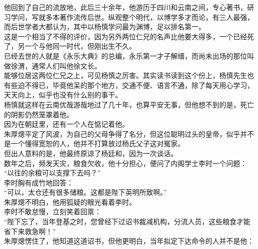\begin{multicols}{\theparacolNo}
他回到了自己的流放地，此后三十余年，他游历于四川和云南之间，专心著书，研习学问，写就多本著作流传后世。纵观整个明代，以博学多才而论，有三人最强，而后世学者大都认为，其中以杨慎学问最为渊博，足以排名第一。\\

这是一个相当了不得的评价，因为另外两位仁兄的名声比他要大得多，一个已经死了，另一个与他同一时代，但刚出生不久。\\

已经去世的人就是《永乐大典》的总编，永乐第一才子解缙，而尚未出场的那位叫做徐渭，通常人们叫他徐文长。\\

能够位居这两位仁兄之上，可见杨慎之厉害。其实读书读到这个份上，杨慎先生也有些迫不得已，毕竟他呆的那个地方，交通不便、语言不通，除了每天用心学习，天天向上，似乎也没有什么别的事干。\\

杨慎就这样在云南优哉游哉地过了几十年，也算平安无事，但他想不到的是，死亡的阴影仍然笼罩着他。\\

因为在朝廷里，还有一个人在惦记着他。\\

朱厚熜平定了风波，为自己的父母争得了名分，但这位聪明过头的皇帝，似乎并不是一个懂得宽恕的人，他并不打算放过杨氏父子这对冤家。\\

但出人意料的是，他最终原谅了杨廷和，因为一次谈话。\\

数年之后，频发天灾，粮食欠收，他十分担心，便问了内阁学士李时一个问题：\\

“以往的余粮可以支撑下去吗？”\\

李时胸有成竹地回答：\\

“可以，太仓还有很多储粮。这都是陛下英明所致啊。”\\

朱厚熜不明白，他用狐疑的眼光看着李时。\\

李时不敢怠慢，立刻笑着回禀：\\

“陛下忘了，当年登基之时，您曾经下过诏书裁减机构，分流人员，这些粮食才能省下来救急啊！”\\

朱厚熜愣住了，他知道这道诏书，但他更明白，当年拟定下达命令的人并不是他：\\


\end{multicols}
